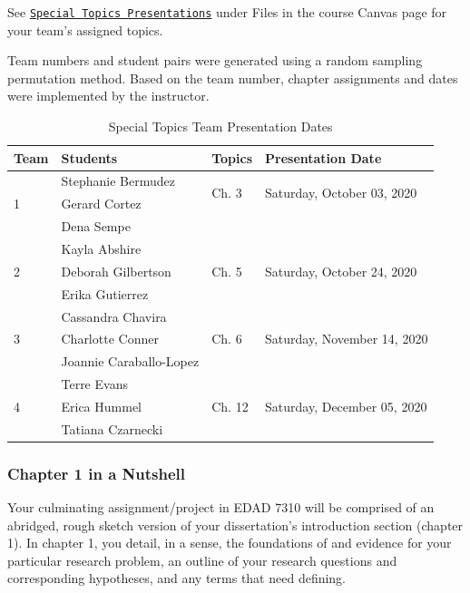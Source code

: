 \documentclass[
]{article}
\begin{document}
See \texttt{\href{https://bit.ly/2EfvCzF}{Special Topics Presentations}}
under Files in the course Canvas page for your team's assigned topics.

Team numbers and student pairs were generated using a random sampling
permutation method. Based on the team number, chapter assignments and
dates were implemented by the instructor.

\begin{table}[H]
\begin{center}
\caption{Special Topics Team Presentation Dates}
\vspace{3mm}
\begin{tabular}{llll}
\hline
\textbf{Team} & \textbf{Students} & \textbf{Topics} & \textbf{Presentation Date} \\
\hline
\multirow{3}{*}{1} & Stephanie Bermudez & \multirow{2}{*}{Ch. 3} & \multirow{2}{*}{Saturday, October 03, 2020} \\
& Gerard Cortez &  &  \\
& Dena Sempe &  &  \\
\hline
\multirow{3}{*}{2} & Kayla Abshire & \multirow{3}{*}{Ch. 5} & \multirow{3}{*}{Saturday, October 24, 2020} \\
& Deborah Gilbertson &  &  \\
& Erika Gutierrez &  &  \\
\hline
\multirow{3}{*}{3} & Cassandra Chavira & \multirow{3}{*}{Ch. 6} & \multirow{3}{*}{Saturday, November 14, 2020} \\
& Charlotte Conner &  & \\
& Joannie Caraballo-Lopez &  & \\
\hline
\multirow{3}{*}{4} & Terre Evans & \multirow{3}{*}{Ch. 12} & \multirow{3}{*}{Saturday, December 05, 2020} \\
& Erica Hummel &  &  \\
& Tatiana Czarnecki &   & \\
\hline
\end{tabular}
\end{center}
\end{table}

\subsubsection{Chapter 1 in a Nutshell}

Your culminating assignment/project in EDAD 7310 will be comprised of an
abridged, rough sketch version of your dissertation's introduction
section (chapter 1). In chapter 1, you detail, in a sense, the
foundations of and evidence for your particular research problem, an
outline of your research questions and corresponding hypotheses, and any
terms that need defining.
\end{document}
